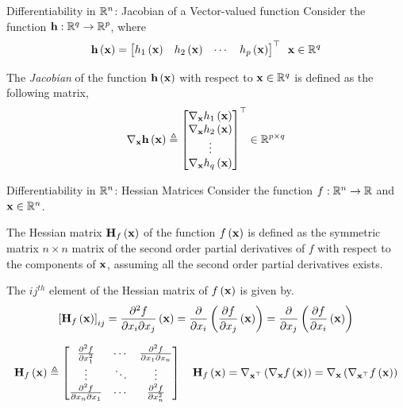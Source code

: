 \documentclass[aspectratio=169]{beamer}
\def\mf{\ensuremath\mathbf}
\def\mb{\ensuremath\mathbb}
\def\lp{\ensuremath\left(}
\def\rp{\ensuremath\right)}
\def\ls{\ensuremath\left[}
\def\rs{\ensuremath\right]}
\def\bmx{\ensuremath\begin{bmatrix*}[r]}
\def\emx{\ensuremath\end{bmatrix*}}
\def\bmxc{\ensuremath\begin{bmatrix*}[c]}
\def\R{\ensuremath\mb{R}}
\newcommand{\ct}[1]{\lp #1\rp}
\begin{document}
\begin{frame}[t]{Differentiability in $\R^n$: Jacobian of a Vector-valued function}
  Consider the function $\mf{h}: \R^q \to \R^p$, where
  \[ \mf{h}\ct{\mf{x}} = \bmx h_1\ct{\mf{x}} & h_2\ct{\mf{x}} & \cdots & h_p\ct{\mf{x}} \emx^\top \,\,\, \mf{x} \in \R^q \]

  The \textit{Jacobian} of the function $\mf{h}\ct{\mf{x}}$ with respect to $\mf{x} \in \R^q$ is defined as the following matrix,
  \[ \nabla_{\mf{x}} \mf{h}\ct{\mf{x}} \triangleq \bmxc \nabla_{\mf{x}} h_1\ct{\mf{x}} \\ \nabla_{\mf{x}} h_2\ct{\mf{x}} \\ \vdots \\ \nabla_{\mf{x}} h_q\ct{\mf{x}}\emx^\top \in \R^{p \times q}\]
\end{frame}


\begin{frame}[t]{Differentiability in $\R^n$: Hessian Matrices}
  Consider the function $f: \R^n \to \R$ and $\mf{x} \in \R^n$. 
  \vspace{0.25cm}

  The Hessian matrix $\mf{H}_f\ct{\mf{x}}$ of the function $f\ct{\mf{x}}$  is defined as the symmetric matrix $n \times n$ matrix of the second order partial derivatives of $f$ with respect to the components of $\mf{x}$, assuming all the second order partial derivatives exists.
  \vspace{0.25cm}

  The $ij^{th}$ element of the Hessian matrix of $f\ct{\mf{x}}$ is given by.
  \[ \ls \mf{H}_f\ct{\mf{x}}\rs_{ij} = \frac{\partial^2 f}{\partial x_i \partial x_j}\ct{\mf{x}} = \frac{\partial}{\partial x_i}\ct{\frac{\partial f}{\partial x_j}\ct{\mf{x}}} = \frac{\partial}{\partial x_j}\ct{\frac{\partial f}{\partial x_i}\ct{\mf{x}}} \]

  \[ \mf{H}_f\ct{\mf{x}} \triangleq \bmxc \frac{\partial^2 f}{\partial x_1^2} & \cdots & \frac{\partial^2 f}{\partial x_1 \partial x_n} \\
  \vdots & \ddots & \vdots \\
  \frac{\partial^2 f}{\partial x_n \partial x_1} & \cdots & \frac{\partial^2 f}{\partial x_n^2} \emx \quad \mf{H}_f\ct{\mf{x}} = \nabla_{\mf{x}^\top}\ct{\nabla_{\mf{x}} f\ct{\mf{x}}} = \nabla_{\mf{x}}\ct{\nabla_{\mf{x}^\top} f\ct{\mf{x}}} \]
\end{frame}
\end{document}
